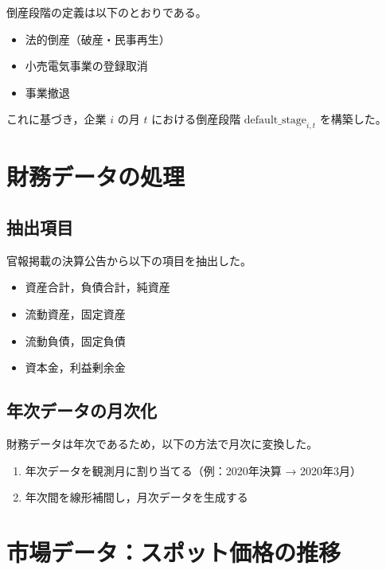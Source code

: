 倒産段階の定義は以下のとおりである。

\begin{itemize}
\item 法的倒産（破産・民事再生）
\item 小売電気事業の登録取消
\item 事業撤退
\end{itemize}

これに基づき，企業 $i$ の月 $t$ における倒産段階 $\text{default\_stage}_{i,t}$ を構築した。


\section{財務データの処理}

\subsection{抽出項目}

官報掲載の決算公告から以下の項目を抽出した。

\begin{itemize}
\item 資産合計，負債合計，純資産
\item 流動資産，固定資産
\item 流動負債，固定負債
\item 資本金，利益剰余金
\end{itemize}

\subsection{年次データの月次化}

財務データは年次であるため，以下の方法で月次に変換した。

\begin{enumerate}
\item 年次データを観測月に割り当てる（例：2020年決算 → 2020年3月）
\item 年次間を線形補間し，月次データを生成する
\end{enumerate}


\section{市場データ：スポット価格の推移}


